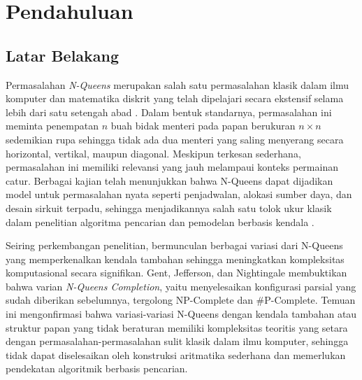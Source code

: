 \chapter{Pendahuluan}
\label{chap:intro}
   
\section{Latar Belakang}
\label{sec:label}

Permasalahan \textit{N-Queens} merupakan salah satu permasalahan klasik dalam ilmu komputer dan matematika diskrit yang telah dipelajari secara ekstensif selama lebih dari satu setengah abad \cite{bell2009survey}. Dalam bentuk standarnya, permasalahan ini meminta penempatan $n$ buah bidak menteri pada papan berukuran $n \times n$ sedemikian rupa sehingga tidak ada dua menteri yang saling menyerang secara horizontal, vertikal, maupun diagonal. Meskipun terkesan sederhana, permasalahan ini memiliki relevansi yang jauh melampaui konteks permainan catur. Berbagai kajian telah menunjukkan bahwa N-Queens dapat dijadikan model untuk permasalahan nyata seperti penjadwalan, alokasi sumber daya, dan desain sirkuit terpadu, sehingga menjadikannya salah satu tolok ukur klasik dalam penelitian algoritma pencarian dan pemodelan berbasis kendala \cite{bell2009survey}.

Seiring perkembangan penelitian, bermunculan berbagai variasi dari N-Queens yang memperkenalkan kendala tambahan sehingga meningkatkan kompleksitas komputasional secara signifikan. Gent, Jefferson, dan Nightingale \cite{gent2017complexity} membuktikan bahwa varian \textit{N-Queens Completion}, yaitu menyelesaikan konfigurasi parsial yang sudah diberikan sebelumnya, tergolong NP-Complete dan \#P-Complete. Temuan ini mengonfirmasi bahwa variasi-variasi N-Queens dengan kendala tambahan atau struktur papan yang tidak beraturan memiliki kompleksitas teoritis yang setara dengan permasalahan-permasalahan sulit klasik dalam ilmu komputer, sehingga tidak dapat diselesaikan oleh konstruksi aritmatika sederhana dan memerlukan pendekatan algoritmik berbasis pencarian.

